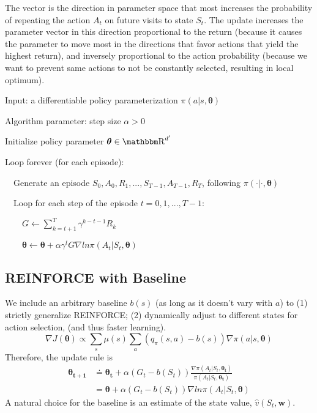 \documentclass[sutton_barto_notes.tex]{subfiles}
\begin{document}
The vector is the direction in parameter space that most increases the probability of repeating the action $A_t$ on future visits to state $S_t$. The update increases the parameter vector in this direction proportional to the return (because it causes the parameter to move most in the directions that favor actions that yield the highest return), and inversely proportional to the action probability (because we want to prevent same actions to not be constantly selected, resulting in local optimum).

\begin{tcolorbox}[width=1.1\textwidth,title={REINFORCE: Monte-Carlo Policy-Gradient Control (episodic) for $\pi_*$}]
Input: a differentiable policy parameterization $\pi(a|s,\bm{\theta})$

Algorithm parameter: step size $\alpha > 0$

Initialize policy parameter $\bm{\theta} \in \R^{d'}$

Loop forever (for each episode):

$\quad$Generate an episode $S_0,A_0,R_1,...,S_{T-1},A_{T-1},R_T$, following $\pi(\cdot|\cdot,\bm{\theta})$

$\quad$Loop for each step of the episode $t=0,1,...,T-1$:

$\quad\quad G\leftarrow\sum_{k=t+1}^T \gamma^{k-t-1}R_k$

$\quad\quad\bm{\theta}\leftarrow\bm{\theta}+\alpha\gamma^t G \nabla ln\pi(A_t | S_t, \bm{\theta})$
\end{tcolorbox}

\subsection{REINFORCE with Baseline}

We include an arbitrary baseline $b(s)$ (as long as it doesn't vary with $a$) to (1) strictly generalize REINFORCE; (2) dynamically adjust to different states for action selection, (and thus faster learning).
$$\nabla J(\bm{\theta}) \propto \sum_s\mu(s)\sum_a (q_\pi(s,a) - b(s))\nabla\pi(a|s,\bm{\theta})$$
Therefore, the update rule is
\begin{align*}
\bm{\theta_{t+1}} &\doteq \bm{\theta_t} + \alpha (G_t - b(S_t)) \frac{\nabla\pi(A_t|S_t,\bm{\theta_t})}{\pi(A_t|S_t,\bm{\theta_t})} \\
&= \bm{\theta} + \alpha (G_t - b(S_t)) \nabla ln \pi(A_t|S_t, \bm{\theta})
\end{align*}
A natural choice for the baseline is an estimate of the state value, $\hat{v}(S_t, \bm{w})$.
\end{document}
